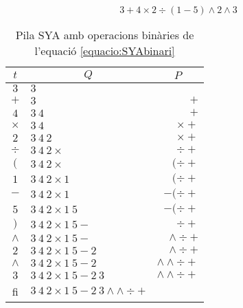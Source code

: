 \begin{equation}
3 + 4 \times 2 \div ( 1 - 5 ) \wedge 2 \wedge 3
\label{equacio:SYAbinari}
\end{equation}

\begin{table}[H]
    \centering
\begin{tabular}{ c l r }
$t$ & \multicolumn{1}{c}{$Q$}   & \multicolumn{1}{c}{$P$}   \\\hline
$3$ & $3$   &       \\
$+$ & $3$   & $+$   \\
$4$ & $3\ 4$   & $+$   \\
$\times$ & $3\ 4$   & $\times+$   \\
$2$ & $3\ 4\ 2$   & $\times+$   \\
$\div$ & $3\ 4\ 2 \times$   & $\div+$   \\
$($ & $3\ 4\ 2 \times$   & $(\div+$   \\
$1$ & $3\ 4\ 2 \times 1$   & $(\div+$   \\
$-$ & $3\ 4\ 2 \times 1$   & $-(\div+$   \\
$5$ & $3\ 4\ 2 \times 1\ 5$   & $-(\div+$   \\
$)$ & $3\ 4\ 2 \times 1\ 5 -$   & $\div+$   \\
$\wedge$ & $3\ 4\ 2 \times 1\ 5 -$   & $\wedge\div+$   \\
$2$ & $3\ 4\ 2 \times 1\ 5 - 2$   & $\wedge\div+$   \\
$\wedge$ & $3\ 4\ 2 \times 1\ 5 - 2$   & $\wedge\wedge\div+$   \\
$3$ & $3\ 4\ 2 \times 1\ 5 - 2\ 3$   & $\wedge\wedge\div+$   \\
fi & $3\ 4\ 2 \times 1\ 5 - 2\ 3 \wedge\wedge\div+$   \\
\end{tabular}
    \caption{Pila SYA amb operacions binàries de l'equació \ref{equacio:SYAbinari}}
    \label{tab:SYAn}
\end{table}
